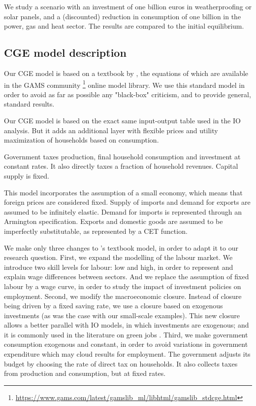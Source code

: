 We study a scenario with an investment of one billion euros in weatherproofing or solar panels, and a (discounted) reduction in consumption of one billion in the power, gas and heat sector.
The results are compared to the initial equilibrium. 


\subsection{CGE model description}
Our CGE model is based on a textbook by \citet{Hosoe2010}, the equations of which are available in the GAMS community \footnote{\url{https://www.gams.com/latest/gamslib\_ml/libhtml/gamslib\_stdcge.html}} online model library. 
We use this standard model in order to avoid as far as possible any "black-box" criticism, and to provide general, standard results.

Our CGE model is based on the exact same input-output table used in the IO analysis. But it adds an additional layer with flexible prices and utility maximization of households based on consumption.

Government taxes production, final household consumption and investment at constant rates.  It also directly taxes a fraction of household revenues. Capital supply is fixed. 

This model incorporates the assumption of a small economy, which means that foreign prices are considered fixed. Supply of imports and demand for exports are assumed to be infinitely elastic.
Demand for imports is represented through an Armington specification. Exports and domestic goods are assumed to be imperfectly substitutable, as represented by a CET function.

We make only three changes to \citet{Hosoe2010}'s textbook model, in order to adapt it to our research question. 
First, we expand the modelling of the labour market. We introduce two skill levels for labour: low and high, in order to represent and explain wage differences between sectors. And we replace the assumption of fixed labour by a wage curve, in order to study the impact of investment policies on employment.
Second, we modify the macroeconomic closure. Instead of closure being driven by a fixed saving rate, we use a closure based on exogenous investments (as was the case with our small-scale examples). This new closure allows a better parallel with IO models, in which investments are exogenous; and it is commonly used in the literature on green jobs \citep{Lehr2008,Lehr2012}.
Third, we make government consumption exogenous and constant, in order to avoid variations in government expenditure which may cloud results for employment. The government adjusts its budget by choosing the rate of direct tax on households. It also collects taxes from production and consumption, but at fixed rates.

